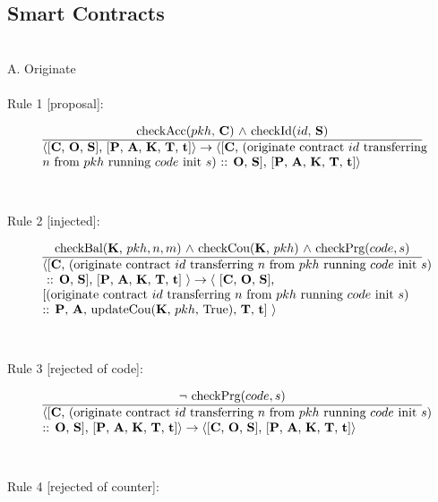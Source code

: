 \documentclass[a4paper]{llncs}
\begin{document}
\subsection{Smart Contracts}
~\\
A. Originate
~\\
~\\
Rule 1 [proposal]:

\begin{equation}{}
  \frac{\text{checkAcc($pkh$, \ACCOUNTS) $\wedge$ checkId($id$, \CONTRACTS)}}
  {\parbox{4.2in}{\text{$\langle$[\ACCOUNTS, \OPERATIONS, \CONTRACTS],
        [\PENDING, \ACCEPTED, \MANAGERS, \CONTRACTORS, \TIME]$\rangle
        \rightarrow \langle$[\ACCOUNTS, 
        (originate contract ${id}$ transferring} \\
  \text{${n}$ from ${pkh}$} \text{running ${code}$ init ${s}$) :: \OPERATIONS, \CONTRACTS], [\PENDING, \ACCEPTED, \MANAGERS, \CONTRACTORS, \TIME]$\rangle$}}} 
\end{equation}
~\\
~\\
Rule 2 [injected]:

\begin{equation}{}
\frac{\text{checkBal(\MANAGERS, $pkh, n, m$) $\wedge$ checkCou(\MANAGERS, $pkh$) $\wedge$ \text{checkPrg($code, s$)}}}{\parbox{4.2in}{\text{$\langle$[\ACCOUNTS, (originate contract ${id}$ transferring  ${n}$ from ${pkh}$ running ${code}$ init ${s}$)} \text{ :: \OPERATIONS, \CONTRACTS], [\PENDING, \ACCEPTED, \MANAGERS, \CONTRACTORS, \TIME] $\rangle \rightarrow \langle$ [\ACCOUNTS, \OPERATIONS, \CONTRACTS],} \text{[(originate contract ${id}$ transferring ${n}$ from ${pkh}$ running ${code}$ init ${s}$)} \text{:: \PENDING, \ACCEPTED, updateCou(\MANAGERS, $pkh$, True), \CONTRACTORS, \TIME] $\rangle$}}} 
\end{equation}
~\\
~\\
Rule 3 [rejected of code]:

\begin{equation}{}
\frac{\text{$\neg$ checkPrg($code, s$)}}{\parbox{4.2in}{\text{$\langle$[\ACCOUNTS, (originate contract ${id}$ transferring  ${n}$ from ${pkh}$ running ${code}$ init ${s}$)} \text{:: \OPERATIONS, \CONTRACTS], [\PENDING, \ACCEPTED, \MANAGERS, \CONTRACTORS, \TIME]$\rangle \rightarrow \langle$[\ACCOUNTS, \OPERATIONS, \CONTRACTS],} \text{[\PENDING, \ACCEPTED, \MANAGERS, \CONTRACTORS, \TIME]$\rangle$}}} 
\end{equation}
~\\
~\\
Rule 4 [rejected of counter]:
\end{document}
